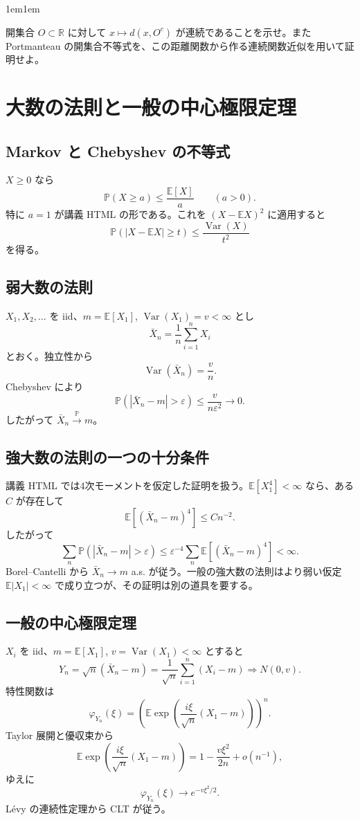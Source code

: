 \documentclass[a4paper,11pt,pdflatex,ja=standard,jafont=ipaex-type1,
  magstyle=real,scale=1]{bxjsarticle}
\theoremstyle{definition}
\theoremstyle{remark}
\newenvironment{exerciseblock}
{\par\medskip\begin{adjustwidth}{1em}{1em}\small\sffamily{\bfseries\color{SoftGray}演習・補足}\par\vspace{0.2em}}
{\end{adjustwidth}\medskip}
\newcommand{\E}{\mathbb E}
\newcommand{\Pp}{\mathbb P}
\newcommand{\R}{\mathbb R}
\newcommand{\1}{\mathbf 1}
\newcommand{\Var}{\operatorname{Var}}
\begin{document}
\begin{exerciseblock}
開集合 $O\subset\R$ に対して $x\mapsto d(x,O^c)$ が連続であることを示せ。また Portmanteau の開集合不等式を、この距離関数から作る連続関数近似を用いて証明せよ。
\end{exerciseblock}


\section{大数の法則と一般の中心極限定理}
\subsection{Markov と Chebyshev の不等式}
$X\ge0$ なら
\[
\Pp(X\ge a)\le\frac{\E[X]}a\qquad(a>0).
\]
特に $a=1$ が講義 HTML の形である。これを $(X-\E X)^2$ に適用すると
\[
\Pp(|X-\E X|\ge t)\le\frac{\Var(X)}{t^2}
\]
を得る。

\subsection{弱大数の法則}
$X_1,X_2,\dots$ を iid、$m=\E[X_1]$, $\Var(X_1)=v<\infty$ とし
\[
\bar X_n=\frac1n\sum_{i=1}^nX_i
\]
とおく。独立性から
\[
\Var(\bar X_n)=\frac vn.
\]
Chebyshev により
\[
\Pp(|\bar X_n-m|>\varepsilon)
\le\frac{v}{n\varepsilon^2}\to0.
\]
したがって $\bar X_n\xrightarrow{\Pp}m$。

\subsection{強大数の法則の一つの十分条件}
講義 HTML では4次モーメントを仮定した証明を扱う。$\E[X_1^4]<\infty$ なら、ある $C$ が存在して
\[
\E[(\bar X_n-m)^4]\le Cn^{-2}.
\]
したがって
\[
\sum_n\Pp(|\bar X_n-m|>\varepsilon)
\le \varepsilon^{-4}\sum_n \E[(\bar X_n-m)^4]<\infty.
\]
Borel--Cantelli から $\bar X_n\to m$ a.s. が従う。一般の強大数の法則はより弱い仮定 $\E|X_1|<\infty$ で成り立つが、その証明は別の道具を要する。

\subsection{一般の中心極限定理}
$X_i$ を iid、$m=\E[X_1]$, $v=\Var(X_1)<\infty$ とすると
\[
Y_n=\sqrt n(\bar X_n-m)
=\frac1{\sqrt n}\sum_{i=1}^n(X_i-m)
\Rightarrow N(0,v).
\]
特性関数は
\[
\varphi_{Y_n}(\xi)
=\left(\E\exp\left(\frac{i\xi}{\sqrt n}(X_1-m)\right)\right)^n.
\]
Taylor 展開と優収束から
\[
\E\exp\left(\frac{i\xi}{\sqrt n}(X_1-m)\right)
=1-\frac{v\xi^2}{2n}+o(n^{-1}),
\]
ゆえに
\[
\varphi_{Y_n}(\xi)\to e^{-v\xi^2/2}.
\]
L\'evy の連続性定理から CLT が従う。
\end{document}
